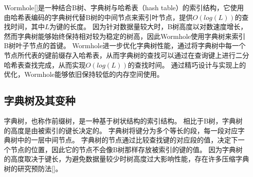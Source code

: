 Wormhole[]是一种结合B树、字典树与哈希表（hash table）的索引结构，它使用由哈希表编码的字典树代替B树的中间节点来索引叶节点，提供$O(log(L))$的查找时间，其中$L$为键的长度。
因为针对数据量较大时，B树高度以对数速度增长，然而字典树能够始终保持相对较为稳定的树高，因此Wormhole使用字典树来索引B树叶子节点的首键。
Wormhole进一步优化字典树性能，通过将字典树中每一个节点所代表的键前缀存入哈希表，从而字典树的查找可以通过在查询键上进行二分哈希表查找完成，从而实现$O(log(L))$的查找时间。
通过精巧设计与实现上的优化，Wormhole能够依旧保持较低的内存空间使用。


\subsection{字典树及其变种}

字典树，也称作前缀树，是一种基于树状结构的索引结构。
相比于B树，字典树的高度是由被索引的键长决定的。
字典树将键分为多个等长的段，每一段对应字典树中的一层中间节点。
字典树的节点通过比较查找键的对应段的值，决定下一个节点的位置，因此它的节点不会像B树那样存放被索引的键的值。
因为字典树的高度取决于键长，为避免数据量较少时树高度过大影响性能，存在许多压缩字典树的研究预防法[]。


